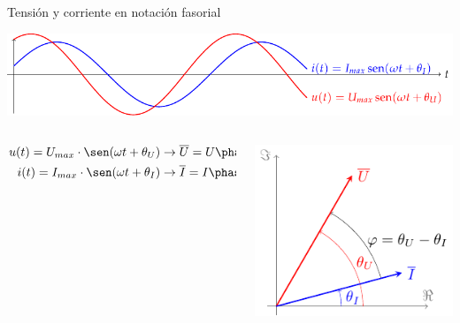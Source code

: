 \documentclass[aspectratio=169, usenames,svgnames,dvipsnames]{beamer}
\begin{document}
\begin{frame}[label={sec:org6462868}]{Tensión y corriente en notación fasorial}
\begin{center}
\includegraphics[width=.9\linewidth]{../figs/ondasTensionCorriente.pdf}
\end{center}

\begin{columns}
\begin{column}{0.5\columnwidth}
\begin{align*}
  u(t) = U_{max} \cdot \sen(\omega t + \theta_U) &\rightarrow \overline{U} = U\phase{\theta_U}\\
  i(t) = I_{max} \cdot \sen(\omega t + \theta_I) &\rightarrow \overline{I} = I\phase{\theta_I}
\end{align*}
\end{column}

\begin{column}{0.5\columnwidth}
\begin{center}
\includegraphics[height=0.5\textheight]{../figs/fasorTensionCorriente.pdf}
\end{center}
\end{column}
\end{columns}
\end{frame}
\end{document}
